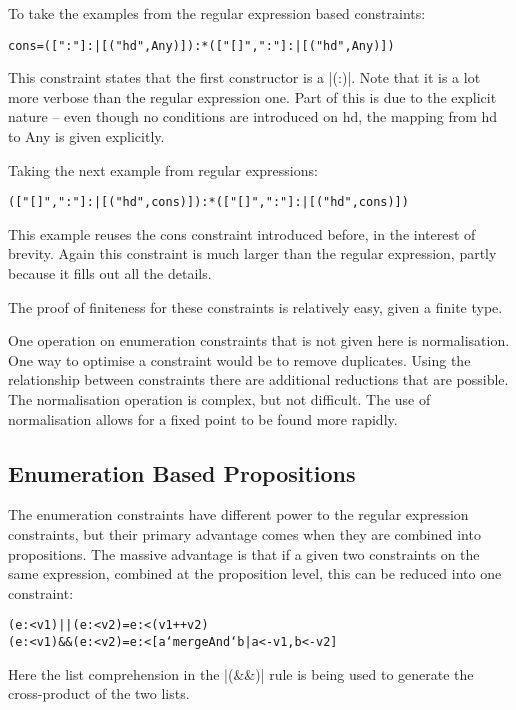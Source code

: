 \documentclass[preprint]{sigplanconf}
\newcommand{\C}[1]{\textsf{#1}}
\newenvironment{code}{\begin{alltt}\small}{\end{alltt}}
\begin{document}
To take the examples from the regular expression based constraints:

\begin{code}
cons = ([":"] :| [("hd",Any)]) :* (["[]",":"] :| [("hd",Any)])
\end{code}

This constraint states that the first constructor is a |(:)|. Note that it is a lot more verbose than the regular expression one. Part of this is due to the explicit nature -- even though no conditions are introduced on \C{hd}, the mapping from \C{hd} to \C{Any} is given explicitly.

Taking the next example from regular expressions:

\begin{code}
(["[]",":"] :| [("hd",cons)]) :* (["[]",":"] :| [("hd",cons)])
\end{code}

This example reuses the \C{cons} constraint introduced before, in the interest of brevity. Again this constraint is much larger than the regular expression, partly because it fills out all the details.

The proof of finiteness for these constraints is relatively easy, given a finite type.

One operation on enumeration constraints that is not given here is normalisation. One way to optimise a constraint would be to remove duplicates. Using the relationship between constraints there are additional reductions that are possible. The normalisation operation is complex, but not difficult. The use of normalisation allows for a fixed point to be found more rapidly.

\subsection{Enumeration Based Propositions}

The enumeration constraints have different power to the regular expression constraints, but their primary advantage comes when they are combined into propositions. The massive advantage is that if a given two constraints on the same expression, combined at the proposition level, this can be reduced into one constraint:

\begin{code}
(e :< v1) || (e :< v2) = e :< (v1 ++ v2)
(e :< v1) && (e :< v2) = e :< [a `mergeAnd` b | a <- v1, b <- v2]
\end{code}

Here the list comprehension in the |(&&)| rule is being used to generate the cross-product of the two lists.
\end{document}
